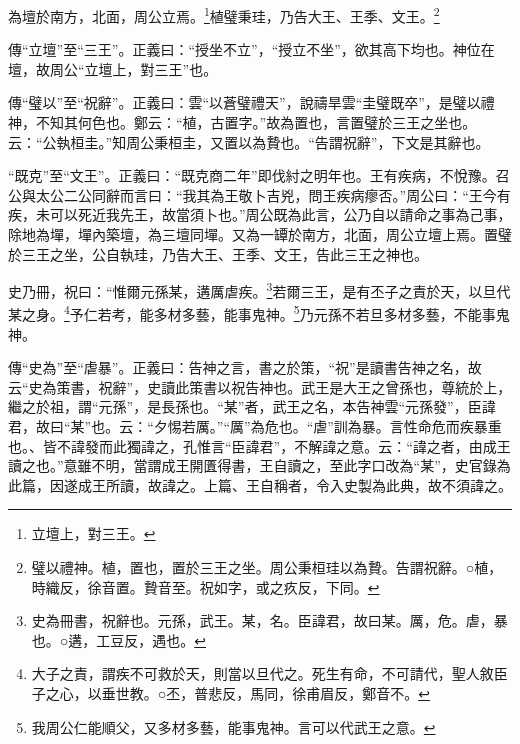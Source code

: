 為壇於南方，北面，周公立焉。\footnote{立壇上，對三王。}植璧秉珪，乃告大王、王季、文王。\footnote{璧以禮神。植，置也，置於三王之坐。周公秉桓珪以為贄。告謂祝辭。○植，時織反，徐音置。贄音至。祝如字，或之疚反，下同。}

{\noindent\zhuan{}\fzbyks 傳“立壇”至“三王”。正義曰：“授坐不立”，“授立不坐”，欲其高下均也。神位在壇，故周公“立壇上，對三王”也。 \par}

{\noindent\zhuan{}\fzbyks 傳“璧以”至“祝辭”。正義曰：雲“以蒼璧禮天”，說禱旱雲“圭璧既卒”，是璧以禮神，不知其何色也。鄭云：“植，古置字。”故為置也，言置璧於三王之坐也。云：“公執桓圭。”知周公秉桓圭，又置以為贄也。“告謂祝辭”，下文是其辭也。 \par}

{\noindent\shu{}\fzkt “既克”至“文王”。正義曰：“既克商二年”即伐紂之明年也。王有疾病，不悅豫。召公與太公二公同辭而言曰：“我其為王敬卜吉兇，問王疾病瘳否。”周公曰：“王今有疾，未可以死近我先王，故當須卜也。”周公既為此言，公乃自以請命之事為己事，除地為墠，墠內築壇，為三壇同墠。又為一罈於南方，北面，周公立壇上焉。置璧於三王之坐，公自執珪，乃告大王、王季、文王，告此三王之神也。 \par}

史乃冊，祝曰：“惟爾元孫某，遘厲虐疾。\footnote{史為冊書，祝辭也。元孫，武王。某，名。臣諱君，故曰某。厲，危。虐，暴也。○遘，工豆反，遇也。}若爾三王，是有丕子之責於天，以旦代某之身。\footnote{大子之責，謂疾不可救於天，則當以旦代之。死生有命，不可請代，聖人敘臣子之心，以垂世教。○丕，普悲反，馬同，徐甫眉反，鄭音不。}予仁若考，能多材多藝，能事鬼神。\footnote{我周公仁能順父，又多材多藝，能事鬼神。言可以代武王之意。}乃元孫不若旦多材多藝，不能事鬼神。


{\noindent\zhuan{}\fzbyks 傳“史為”至“虐暴”。正義曰：告神之言，書之於策，“祝”是讀書告神之名，故云“史為策書，祝辭”，史讀此策書以祝告神也。武王是大王之曾孫也，尊統於上，繼之於祖，謂“元孫”，是長孫也。“某”者，武王之名，本告神雲“元孫發”，臣諱君，故曰“某”也。云：“夕惕若厲。”“厲”為危也。“虐”訓為暴。言性命危而疾暴重也。、皆不諱發而此獨諱之，孔惟言“臣諱君”，不解諱之意。云：“諱之者，由成王讀之也。”意雖不明，當謂成王開匱得書，王自讀之，至此字口改為“某”，史官錄為此篇，因遂成王所讀，故諱之。上篇、王自稱者，令入史製為此典，故不須諱之。 \par}

